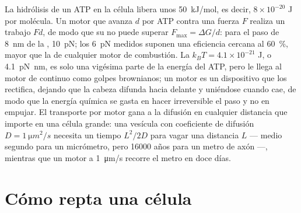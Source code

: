\begin{proposition}\label{prop:b3:cytoskeleton-motility:physics}
La hidrólisis de un ATP en la célula libera unos \qty{50}{kJ/mol}, es
decir, $8\times 10^{-20}$ J por molécula. Un motor que avanza $d$ por ATP
contra una fuerza $F$ realiza un trabajo $Fd$, de modo que su
\emph{} no puede superar $F_{\max} = \Delta G/d$: para el
paso de \qty{8}{nm} de la , \qty{10}{pN}; los \qty{6}{pN}
medidos suponen una eficiencia cercana al \qty{60}{\%}, mayor que la de
cualquier motor de combustión. La  $k_{B}T =
4.1\times 10^{-21}$ J, o \qty{4.1}{pN.nm}, es solo una vigésima parte de
la energía del ATP, pero le llega al motor de continuo como golpes
brownianos; un motor es un dispositivo que los rectifica, dejando que la
cabeza difunda hacia delante y uniéndose cuando cae, de modo que la
energía química se gasta en hacer irreversible el paso y no en empujar.
El transporte por motor gana a la difusión en cualquier distancia que
importe en una célula grande: una vesícula con coeficiente de difusión
$D = \qty{1}{\micro
m^2/s}$ necesita un tiempo $L^{2}/2D$ para vagar una distancia $L$ ---
medio segundo para un micrómetro, pero \num{16000} años para un metro de
axón ---, mientras que un motor a \qty{1}{\micro m/s} recorre el metro en
doce días.
\end{proposition}
\admitted

\section{Cómo repta una célula}

